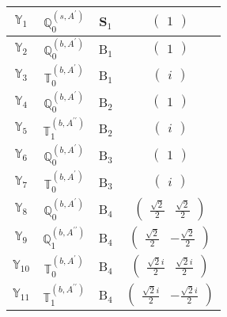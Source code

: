 \documentclass[fleqn,10pt,landscape]{article}
\begin{document}
\begin{itemize}
\begin{center}
\begin{longtable}{c|c|c|c}
$ \mathbb{Y}_{1} $ & $\mathbb{Q}_{0}^{(s,A^{\prime})}$ & S$_{1}$ & $\begin{pmatrix} 1 \end{pmatrix}$ \\ \hline
$ \mathbb{Y}_{2} $ & $\mathbb{Q}_{0}^{(b,A^{\prime})}$ & B$_{1}$ & $\begin{pmatrix} 1 \end{pmatrix}$ \\
$ \mathbb{Y}_{3} $ & $\mathbb{T}_{0}^{(b,A^{\prime})}$ & B$_{1}$ & $\begin{pmatrix} i \end{pmatrix}$ \\ \hline
$ \mathbb{Y}_{4} $ & $\mathbb{Q}_{0}^{(b,A^{\prime})}$ & B$_{2}$ & $\begin{pmatrix} 1 \end{pmatrix}$ \\
$ \mathbb{Y}_{5} $ & $\mathbb{T}_{1}^{(b,A^{\prime\prime})}$ & B$_{2}$ & $\begin{pmatrix} i \end{pmatrix}$ \\ \hline
$ \mathbb{Y}_{6} $ & $\mathbb{Q}_{0}^{(b,A^{\prime})}$ & B$_{3}$ & $\begin{pmatrix} 1 \end{pmatrix}$ \\
$ \mathbb{Y}_{7} $ & $\mathbb{T}_{0}^{(b,A^{\prime})}$ & B$_{3}$ & $\begin{pmatrix} i \end{pmatrix}$ \\ \hline
$ \mathbb{Y}_{8} $ & $\mathbb{Q}_{0}^{(b,A^{\prime})}$ & B$_{4}$ & $\begin{pmatrix} \frac{\sqrt{2}}{2} & \frac{\sqrt{2}}{2} \end{pmatrix}$ \\
$ \mathbb{Y}_{9} $ & $\mathbb{Q}_{1}^{(b,A^{\prime\prime})}$ & B$_{4}$ & $\begin{pmatrix} \frac{\sqrt{2}}{2} & - \frac{\sqrt{2}}{2} \end{pmatrix}$ \\
$ \mathbb{Y}_{10} $ & $\mathbb{T}_{0}^{(b,A^{\prime})}$ & B$_{4}$ & $\begin{pmatrix} \frac{\sqrt{2} i}{2} & \frac{\sqrt{2} i}{2} \end{pmatrix}$ \\
$ \mathbb{Y}_{11} $ & $\mathbb{T}_{1}^{(b,A^{\prime\prime})}$ & B$_{4}$ & $\begin{pmatrix} \frac{\sqrt{2} i}{2} & - \frac{\sqrt{2} i}{2} \end{pmatrix}$ \\ \hline

\end{longtable}
\end{center}
\end{itemize}
\end{document}
